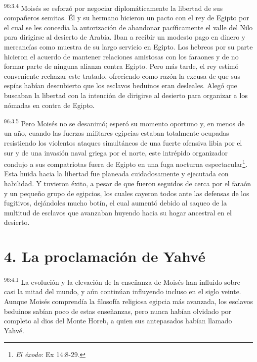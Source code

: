 \par
\textsuperscript{96:3.4} Moisés se esforzó por negociar diplomáticamente la libertad de sus compañeros semitas. Él y su hermano hicieron un pacto con el rey de Egipto por el cual se les concedía la autorización de abandonar pacíficamente el valle del Nilo para dirigirse al desierto de Arabia. Iban a recibir un modesto pago en dinero y mercancías como muestra de su largo servicio en Egipto. Los hebreos por su parte hicieron el acuerdo de mantener relaciones amistosas con los faraones y de no formar parte de ninguna alianza contra Egipto. Pero más tarde, el rey estimó conveniente rechazar este tratado, ofreciendo como razón la excusa de que sus espías habían descubierto que los esclavos beduinos eran desleales. Alegó que buscaban la libertad con la intención de dirigirse al desierto para organizar a los nómadas en contra de Egipto.

\par
\textsuperscript{96:3.5} Pero Moisés no se desanimó; esperó su momento oportuno y, en menos de un año, cuando las fuerzas militares egipcias estaban totalmente ocupadas resistiendo los violentos ataques simultáneos de una fuerte ofensiva libia por el sur y de una invasión naval griega por el norte, este intrépido organizador condujo a sus compatriotas fuera de Egipto en una fuga nocturna espectacular\footnote{\textit{El éxodo}: Ex 14:8-29.}. Esta huida hacia la libertad fue planeada cuidadosamente y ejecutada con habilidad. Y tuvieron éxito, a pesar de que fueron seguidos de cerca por el faraón y un pequeño grupo de egipcios, los cuales cayeron todos ante las defensas de los fugitivos, dejándoles mucho botín, el cual aumentó debido al saqueo de la multitud de esclavos que avanzaban huyendo hacia su hogar ancestral en el desierto.

\section*{4. La proclamación de Yahvé}
\par
\textsuperscript{96:4.1} La evolución y la elevación de la enseñanza de Moisés han influido sobre casi la mitad del mundo, y aún continúan influyendo incluso en el siglo veinte. Aunque Moisés comprendía la filosofía religiosa egipcia más avanzada, los esclavos beduinos sabían poco de estas enseñanzas, pero nunca habían olvidado por completo al dios del Monte Horeb, a quien sus antepasados habían llamado Yahvé.

